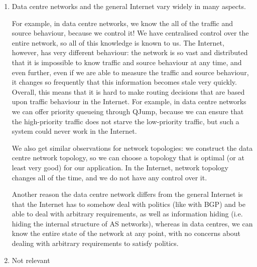 


\begin{enumerate}[label=(\alph*)]
  \item
    Data centre networks and the general Internet vary widely in many aspects.

    For example, in data centre networks, we know the all of the traffic and source behaviour, because we control it! We have centralised control over the entire network, so all of this knowledge is known to us. The Internet, however, has very different behaviour: the network is so vast and distributed that it is impossible to know traffic and source behaviour at any time, and even further, even if we are able to measure the traffic and source behaviour, it changes so frequently that this information becomes stale very quickly. Overall, this means that it is hard to make routing decisions that are based upon traffic behaviour in the Internet. For example, in data centre networks we can offer priority queueing through QJump, because we can ensure that the high-priority traffic does not starve the low-priority traffic, but such a system could never work in the Internet.

    We also get similar observations for network topologies: we construct the data centre network topology, so we can choose a topology that is optimal (or at least very good) for our application. In the Internet, network topology changes all of the time, and we do not have any control over it.

    Another reason the data centre network differs from the general Internet is that the Internet has to somehow deal with politics (like with BGP) and be able to deal with arbitrary requirements, as well as information hiding (i.e. hiding the internal structure of AS networks), whereas in data centres, we can know the entire state of the network at any point, with no concerns about dealing with arbitrary requirements to satisfy politics.

  \item
    Not relevant
        
\end{enumerate}

